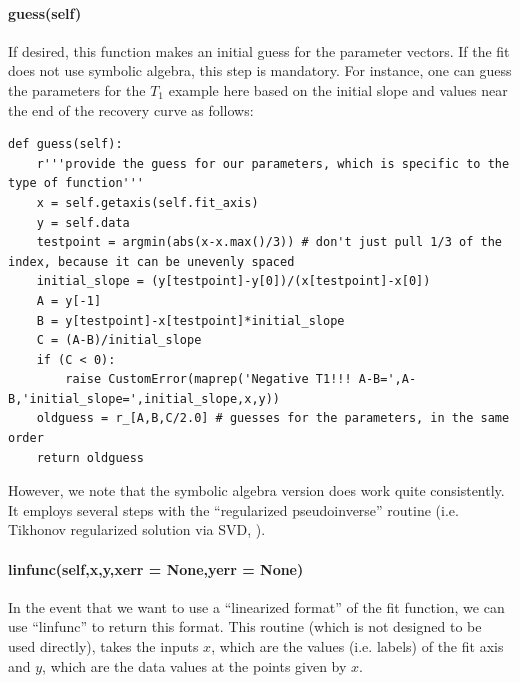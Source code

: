 \paragraph{guess(self)}
If desired, this function makes an initial guess for the
    parameter vectors.
If the fit does not use symbolic algebra, this step is mandatory.
For instance, one can guess the parameters for the $T_1$ example
    here based on the initial slope and values near the end
    of the recovery curve as follows:
\begin{lstlisting}
def guess(self):
    r'''provide the guess for our parameters, which is specific to the type of function'''
    x = self.getaxis(self.fit_axis)
    y = self.data
    testpoint = argmin(abs(x-x.max()/3)) # don't just pull 1/3 of the index, because it can be unevenly spaced
    initial_slope = (y[testpoint]-y[0])/(x[testpoint]-x[0])
    A = y[-1]
    B = y[testpoint]-x[testpoint]*initial_slope
    C = (A-B)/initial_slope
    if (C < 0):
        raise CustomError(maprep('Negative T1!!! A-B=',A-B,'initial_slope=',initial_slope,x,y))
    oldguess = r_[A,B,C/2.0] # guesses for the parameters, in the same order
    return oldguess
\end{lstlisting}

However, we note that the symbolic algebra version does work quite
    consistently.
It employs several steps with the ``regularized pseudoinverse'' routine (i.e. Tikhonov regularized solution via SVD, ).
\paragraph{linfunc(self,x,y,xerr = None,yerr = None)}
In the event that we want to use a ``linearized format'' of the fit function,
    we can use ``linfunc'' to return this format.
This routine (which is not designed to be used directly), 
    takes the inputs $x$, which are the values (i.e. labels)
    of the fit axis and
    $y$, which are the data values at the points given by $x$.

